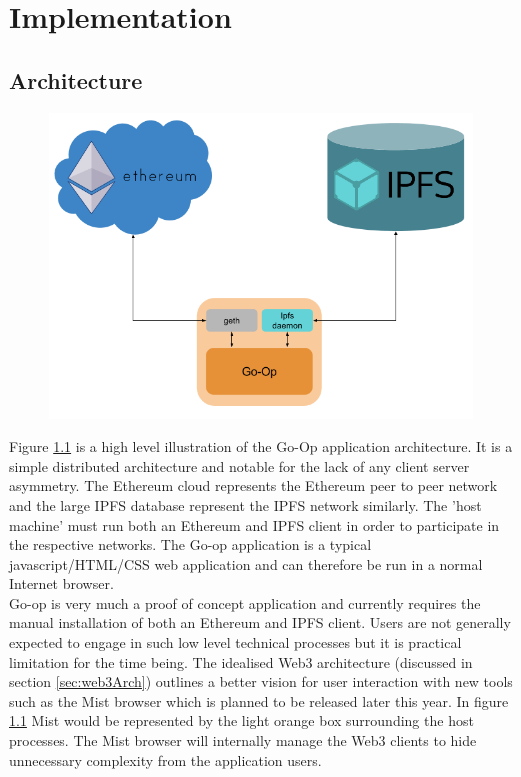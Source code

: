 
\chapter{Implementation} %

\label{Implementation} %

\section{Architecture}
\begin{figure}
\centering
\includegraphics[width=\textwidth]{Figures/GoopArch}
\decoRule
\caption[]{}
\label{fig:GoopArch}
\end{figure}

Figure \ref{fig:GoopArch} is a high level illustration of the Go-Op application architecture. It is a simple distributed architecture and notable for the lack of any client server asymmetry. The Ethereum cloud represents the Ethereum peer to peer network and the large IPFS database represent the IPFS network similarly. The 'host machine' must run both an Ethereum and IPFS client in order to participate in the respective networks. The Go-op application is a typical javascript/HTML/CSS web application and can therefore be run in a normal Internet browser. \\

Go-op is very much a proof of concept application and currently requires the manual installation of both an Ethereum and IPFS client. Users are not generally expected to engage in such low level technical processes but it is practical limitation for the time being. The idealised Web3 architecture (discussed in section \ref{sec:web3Arch}) outlines a better vision for user interaction with new tools such as the Mist browser which is planned to be released later this year. In figure \ref{fig:GoopArch} Mist would be represented by the light orange box surrounding the host processes. The Mist browser will internally manage the Web3 clients to hide unnecessary complexity from the application users. \\


